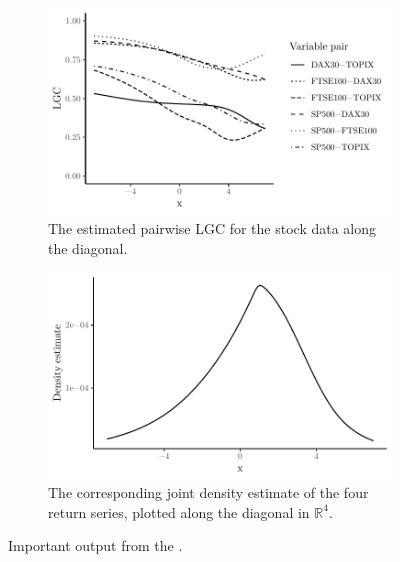 \begin{figure}[t]
    \centering
    \begin{subfigure}[t]{0.48\textwidth}
      \includegraphics[width=\textwidth]{loccor-example}
      \caption{The estimated pairwise LGC for the stock \newline data along the diagonal.}
      \label{fig:lgc-plot1}
    \end{subfigure}
    \begin{subfigure}[t]{0.48\textwidth}
      \includegraphics[width=\textwidth]{density-example}
      \caption{The corresponding joint density estimate of the four return series, plotted along the diagonal in $\mathbb{R}^4$.}
      \label{fig:lgc-plot2}
    \end{subfigure}
    \caption{Important output from the .}
    \label{fig:lgc-plot}
  \end{figure}

